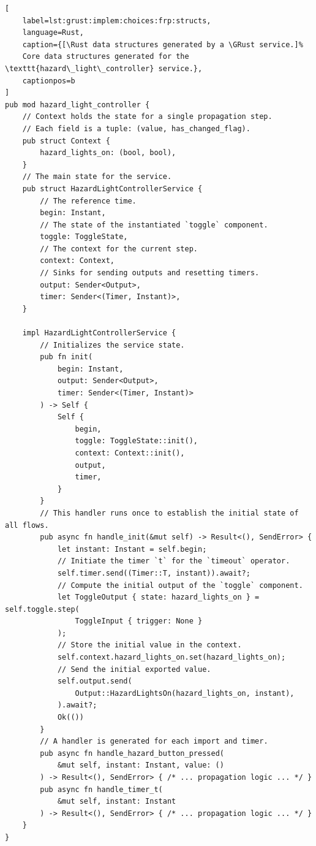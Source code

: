 \begin{lstlisting}[
    label=lst:grust:implem:choices:frp:structs,
    language=Rust,
    caption={[\Rust data structures generated by a \GRust service.]%
    Core data structures generated for the \texttt{hazard\_light\_controller} service.},
    captionpos=b
]
pub mod hazard_light_controller {
    // Context holds the state for a single propagation step.
    // Each field is a tuple: (value, has_changed_flag).
    pub struct Context {
        hazard_lights_on: (bool, bool),
    }
    // The main state for the service.
    pub struct HazardLightControllerService {
        // The reference time.
        begin: Instant,
        // The state of the instantiated `toggle` component.
        toggle: ToggleState,
        // The context for the current step.
        context: Context,
        // Sinks for sending outputs and resetting timers.
        output: Sender<Output>,
        timer: Sender<(Timer, Instant)>,
    }

    impl HazardLightControllerService {
        // Initializes the service state.
        pub fn init(
            begin: Instant,
            output: Sender<Output>,
            timer: Sender<(Timer, Instant)>
        ) -> Self {
            Self {
                begin,
                toggle: ToggleState::init(),
                context: Context::init(),
                output,
                timer,
            }
        }
        // This handler runs once to establish the initial state of all flows.
        pub async fn handle_init(&mut self) -> Result<(), SendError> {
            let instant: Instant = self.begin;
            // Initiate the timer `t` for the `timeout` operator.
            self.timer.send((Timer::T, instant)).await?;
            // Compute the initial output of the `toggle` component.
            let ToggleOutput { state: hazard_lights_on } = self.toggle.step(
                ToggleInput { trigger: None }
            );
            // Store the initial value in the context.
            self.context.hazard_lights_on.set(hazard_lights_on);
            // Send the initial exported value.
            self.output.send(
                Output::HazardLightsOn(hazard_lights_on, instant),
            ).await?;
            Ok(())
        }
        // A handler is generated for each import and timer.
        pub async fn handle_hazard_button_pressed(
            &mut self, instant: Instant, value: ()
        ) -> Result<(), SendError> { /* ... propagation logic ... */ }
        pub async fn handle_timer_t(
            &mut self, instant: Instant
        ) -> Result<(), SendError> { /* ... propagation logic ... */ }
    }
}
\end{lstlisting}

